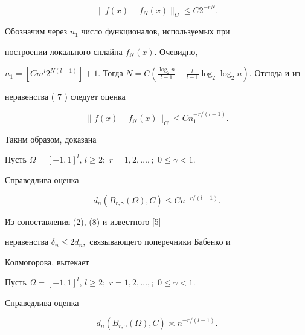 \begin {equation}


\| f(x)-f_N(x)\|_C \le C2^{-rN}.


\end {equation}


Обозначим через $n_1$ число функционалов, используемых при


построении локального сплайна $f_N(x).$ Очевидно,


$n_1=[C m^l 2^{N(l-1)}]+1.$ Тогда $N=C(\frac{\log_2 n}{l-1}-\frac{l}


{l-1}\log_2\log_2 n).$ Отсюда и из


неравенства ( 7 ) следует оценка


\begin {equation}


\| f(x)-f_N(x)\|_C \le C n_1^{-r/(l-1)}.


\end {equation}





Таким образом, доказана





\begin{thms}


Пусть $\Omega=[-1,1]^l$, $l\ge 2;$ $r=1,2,\dotsc,;$ $0 \le \gamma <1.$


Справедлива оценка


$$


d_n(B_{r,\gamma}(\Omega), C) \le C n^{-r/(l-1)}.


$$


\end{thms}





Из сопоставления (2), (8) и известного [5]


неравенства $\delta_n \le 2 d_n ,$ связывающего поперечники Бабенко и


Колмогорова, вытекает





\begin{thms}


Пусть $\Omega=[-1,1]^l$, $l\ge 2;$ $r=1,2,\dotsc,;$ $0 \le \gamma <1.$


Справедлива оценка


$$


d_n(B_{r,\gamma}(\Omega), C) \asymp n^{-r/(l-1)}.


$$


\end{thms}





